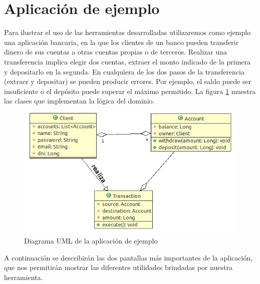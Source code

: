 \section{Aplicación de ejemplo}
\label{Example}
Para ilustrar el uso de las herramientas desarrolladas utilizaremos como ejemplo
una aplicación bancaria, en la que los clientes de un banco pueden transferir
dinero de sus cuentas a otras cuentas propias o de terceros. 
Realizar una transferencia implica elegir dos cuentas, extraer el
monto indicado de la primera y depositarlo en la segunda. 
En cualquiera de los dos pasos de la transferencia (extraer y depositar) se
pueden producir errores.
Por ejemplo, el saldo puede ser insuficiente o el depósito puede superar el
máximo permitido.
La figura \ref{example} muestra las clases que implementan la lógica del
dominio.

	\begin{figure}[h!]
		\centering
		\includegraphics[scale=0.5]{img/transaccion}
		\caption{Diagrama UML de la aplicación de ejemplo}
		\label{example}
	\end{figure}	

A continuación se describirán las dos pantallas más importantes de la
aplicación, que nos permitirán mostrar las diferentes utilidades brindadas por
nuestra herramienta.
 
